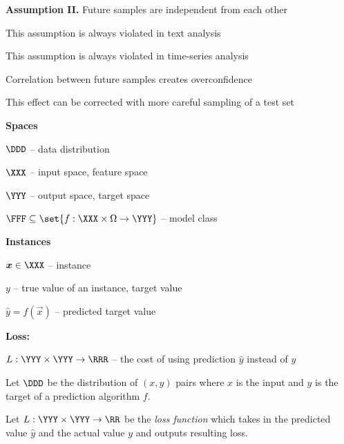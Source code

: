 \documentclass[landscape,footrule]{foils}
\begin{document}
\textbf{Assumption II.} Future samples are independent from each other
\begin{triangles}
\item This assumption is always violated in text analysis
\item This assumption is always violated in time-series analysis
\item Correlation between future samples creates overconfidence
\item This effect can be corrected with more careful sampling of a test set
\end{triangles}


\textbf{Spaces}
\begin{triangles}
\item $\DDD$ -- data distribution
\item $\XXX$ -- input space, feature space
\item $\YYY$ -- output space, target space
\item $\FFF\subseteq\set{f:\XXX\times\Omega\to\YYY}$ -- model class\vspace*{0.5cm}
\end{triangles}

\textbf{Instances}
\begin{triangles}
\item $\vec{x}\in\XXX$ -- instance
\item $y$ -- true value of an instance, target value
\item $\hat{y}=f(\vec{x})$ -- predicted target value\vspace*{0.5cm}
\end{triangles}

\textbf{Loss:}
\begin{triangles}
\item $L:\YYY\times\YYY\to\RRR$ --  the cost of using prediction $\hat{y}$ instead of $y$
\end{triangles}
 
\foilhead[-1cm]{}

 

Let $\DDD$ be the distribution of $(x,y)$ pairs where $x$ is the input and $y$ is the target of a prediction algorithm $f$. 
\bigskip

Let $L:\YYY\times\YYY\to\RR$ be the \emph{loss function} which takes in the predicted value $\hat{y}$ and the actual value $y$ and outputs resulting loss.
\bigskip
\end{document}
